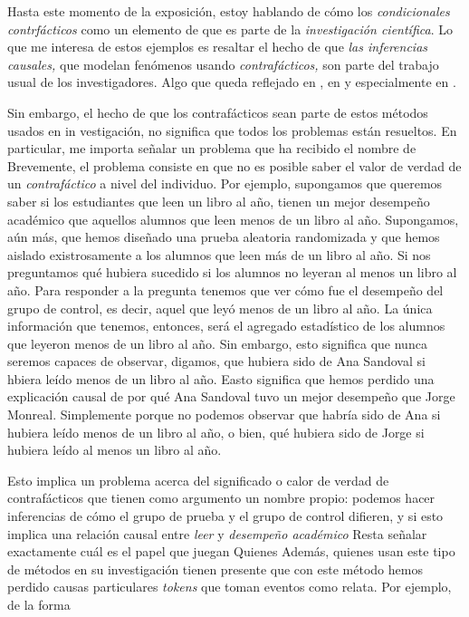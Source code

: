Hasta este momento de la exposición, estoy hablando de cómo los
\emph{condicionales contrfácticos} como un elemento de que es parte
de la \emph{investigación científica}. Lo que me interesa de estos
ejemplos es resaltar el hecho de que \emph{las inferencias causales,} que modelan fenómenos usando \emph{contrafácticos,} son parte del trabajo usual de los investigadores. Algo que queda reflejado en \parencite{Pearl2016}, en \parencite{Pearl2018} y especialmente en
\parencite{llaudet2023}.

Sin embargo, el hecho de que los contrafácticos sean parte de estos
métodos usados en in vestigación, no significa que todos los
problemas están resueltos. En particular, me importa señalar un
problema que ha recibido el nombre de  Brevemente, el problema consiste en que no
es posible saber el valor de verdad de un \emph{contrafáctico} a
nivel del individuo. Por ejemplo, supongamos que queremos saber si
los estudiantes que leen un libro al año, tienen un mejor desempeño
académico que aquellos alumnos que leen menos de un libro al año.
Supongamos, aún más, que hemos diseñado una prueba aleatoria
randomizada y que hemos aislado existrosamente a los alumnos que
leen más de un libro al año. Si nos preguntamos qué hubiera sucedido
si los alumnos no leyeran al menos un libro al año. Para responder a
la pregunta  tenemos que ver cómo
fue el desempeño del grupo de control, es decir, aquel que leyó
menos de un libro al año. La única información que tenemos,
entonces, será el agregado estadístico de los alumnos que leyeron
menos de un libro al año. Sin embargo, esto significa que nunca
seremos capaces de observar, digamos, que hubiera sido de Ana
Sandoval si hbiera leído menos de un libro al año. Easto significa
que hemos perdido una explicación causal de por qué Ana Sandoval
tuvo un mejor desempeño que Jorge Monreal. Simplemente porque no
podemos observar que habría sido de Ana si hubiera leído menos de un
libro al año, o bien, qué hubiera sido de Jorge si hubiera leído al
menos un libro al año.

Esto implica un problema acerca del significado o calor de verdad de contrafácticos que tienen como argumento un nombre propio: podemos hacer inferencias de cómo el grupo de prueba y el grupo de control difieren, y si esto implica una relación causal entre \emph{leer} y \emph{desempeño académico}
Resta señalar exactamente cuál es el papel que juegan  Quienes  Además, quienes usan este tipo de métodos en su investigación tienen presente que con este método hemos perdido causas particulares \emph{tokens} que toman eventos como relata. Por ejemplo,  de la forma

